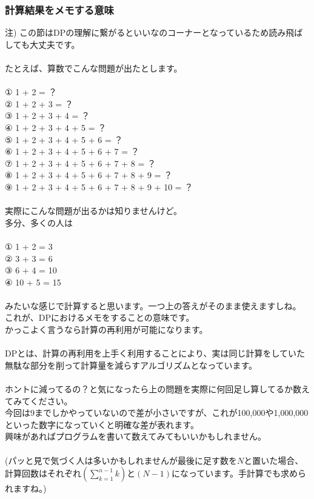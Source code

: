 \clearpage

\subsubsection{計算結果をメモする意味}
\noindent
注) この節はDPの理解に繋がるといいなのコーナーとなっているため読み飛ばしても大丈夫です。
\\ \\ \noindent
たとえば、算数でこんな問題が出たとします。
\\ \\ \noindent
① 1 + 2 = ？\\
② 1 + 2 + 3 = ？\\
③ 1 + 2 + 3 + 4 = ？\\
④ 1 + 2 + 3 + 4 + 5 = ？\\
⑤ 1 + 2 + 3 + 4 + 5 + 6 = ？\\
⑥ 1 + 2 + 3 + 4 + 5 + 6 + 7 = ？\\
⑦ 1 + 2 + 3 + 4 + 5 + 6 + 7 + 8 = ？\\
⑧ 1 + 2 + 3 + 4 + 5 + 6 + 7 + 8 + 9 = ？\\
⑨ 1 + 2 + 3 + 4 + 5 + 6 + 7 + 8 + 9 + 10 = ？
\\ \\ \noindent
実際にこんな問題が出るかは知りませんけど。\\
多分、多くの人は
\\ \\ \noindent
① 1 + 2 = 3\\
② 3 + 3 = 6\\
③ 6 + 4 = 10\\
④ 10 + 5 = 15
\\ \\ \noindent
みたいな感じで計算すると思います。一つ上の答えがそのまま使えますしね。\\
これが、DPにおけるメモをすることの意味です。\\
かっこよく言うなら計算の再利用が可能になります。
\\ \\ \noindent
DPとは、計算の再利用を上手く利用することにより、実は同じ計算をしていた無駄な部分を削って計算量を減らすアルゴリズムとなっています。
\\ \\ \noindent
ホントに減ってるの？と気になったら上の問題を実際に何回足し算してるか数えてみてください。\\
今回は9までしかやっていないので差が小さいですが、これが100,000や1,000,000といった数字になっていくと明確な差が表れます。\\
興味があればプログラムを書いて数えてみてもいいかもしれません。
\\ \\ \noindent
(パッと見で気づく人は多いかもしれませんが最後に足す数を$N$と置いた場合、計算回数はそれぞれ$(\sum^{n-1}_{k=1}k)$と$(N-1)$になっています。手計算でも求められますね。)

